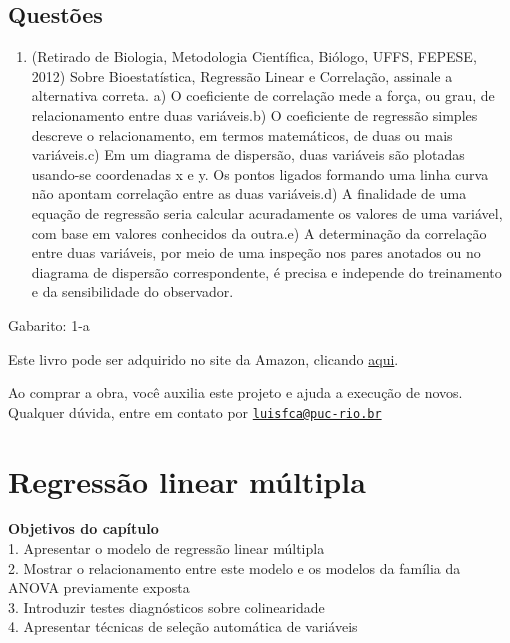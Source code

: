 \documentclass[
]{book}
\providecommand{\tightlist}{%
  \setlength{\itemsep}{0pt}\setlength{\parskip}{0pt}}
\newenvironment{objectives}{
  \definecolor{shadecolor}{rgb}{0, 0, 0}  %
  \color{white}
  \begin{shaded}}
 {\end{shaded}}
\begin{document}
\hypertarget{questuxf5es-8}{%
\section{Questões}\label{questuxf5es-8}}

\begin{enumerate}
\def\labelenumi{\arabic{enumi}.}
\tightlist
\item
  (Retirado de Biologia, Metodologia Científica, Biólogo, UFFS, FEPESE, 2012) Sobre Bioestatística, Regressão Linear e Correlação, assinale a alternativa correta. a) O coeficiente de correlação mede a força, ou grau, de relacionamento entre duas variáveis.b) O coeficiente de regressão simples descreve o relacionamento, em termos matemáticos, de duas ou mais variáveis.c) Em um diagrama de dispersão, duas variáveis são plotadas usando-se coordenadas x e y. Os pontos ligados formando uma linha curva não apontam correlação entre as duas variáveis.d) A finalidade de uma equação de regressão seria calcular acuradamente os valores de uma variável, com base em valores conhecidos da outra.e) A determinação da correlação entre duas variáveis, por meio de uma inspeção nos pares anotados ou no diagrama de dispersão correspondente, é precisa e independe do treinamento e da sensibilidade do observador.
\end{enumerate}

Gabarito: 1-a

Este livro pode ser adquirido no site da Amazon, clicando \href{https://www.amazon.com.br/gp/product/B097CP7T9M?pf_rd_r=RDZC8XYMBC1WY69T0J8K\&pf_rd_p=abb22e6b-8812-4b76-a424-5f0b098d2c90\&pd_rd_r=ceec1911-f409-4acd-ac8f-2d5bc68dac43\&pd_rd_w=wMUzJ\&pd_rd_wg=ZK85a\&ref_=pd_gw_unk}{aqui}.

Ao comprar a obra, você auxilia este projeto e ajuda a execução de novos. Qualquer dúvida, entre em contato por \href{mailto:luisfca@puc-rio.br}{\nolinkurl{luisfca@puc-rio.br}}

\hypertarget{regressuxe3o-linear-muxfaltipla}{%
\chapter{Regressão linear múltipla}\label{regressuxe3o-linear-muxfaltipla}}

\begin{objectives}
\textbf{Objetivos do capítulo}\\
1. Apresentar o modelo de regressão linear múltipla\\
2. Mostrar o relacionamento entre este modelo e os modelos da família da ANOVA previamente exposta\\
3. Introduzir testes diagnósticos sobre colinearidade\\
4. Apresentar técnicas de seleção automática de variáveis

\end{objectives}
\end{document}
